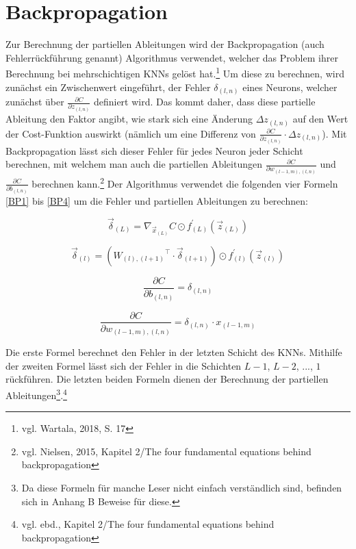 \documentclass[
	a4paper,
	12pt,
	ngerman,
	oneside
]{scrreprt}											%
\begin{document}
		\section{Backpropagation} \label{Backpropagation}
			Zur Berechnung der partiellen Ableitungen wird der Backpropagation (auch Fehlerrückführung genannt) Algorithmus verwendet, welcher das Problem ihrer Berechnung bei mehrschichtigen KNNs gelöst hat.\footnote{vgl. Wartala, 2018, S. 17} Um diese zu berechnen, wird zunächst ein Zwischenwert eingeführt, der Fehler $\delta_{(l,n)}$ eines Neurons, welcher zunächst über $\frac{\partial C}{\partial z_{(l,n)}}$ definiert wird. Das kommt daher, dass diese partielle Ableitung den Faktor angibt, wie stark sich eine Änderung $\Delta z_{(l,n)}$ auf den Wert der Cost-Funktion auswirkt (nämlich um eine Differenz von $\frac{\partial C}{\partial z_{(l,n)}} \cdot \Delta z_{(l,n)}$). Mit Backpropagation lässt sich dieser Fehler für jedes Neuron jeder Schicht berechnen, mit welchem man auch die partiellen Ableitungen $\frac{\partial C}{\partial w_{(l-1,m),(l,n)}}$ und $\frac{\partial C}{\partial b_{(l,n)}}$ berechnen kann.\footnote{vgl. Nielsen, 2015, Kapitel 2/The four fundamental equations behind backpropagation} Der Algorithmus verwendet die folgenden vier Formeln \ref{BP1} bis \ref{BP4} um die Fehler und partiellen Ableitungen zu berechnen: 
	
			\begin{equation}\label{BP1}
				\vec{\delta}_{(L)} = \nabla_{\vec{x}_{(L)}}C \odot f_{(L)}^{\prime} (\vec{z}_{(L)})
			\end{equation}
			
			\begin{equation}\label{BP2}
				\vec{\delta}_{(l)} = ({W_{(l),(l+1)}}^\intercal \cdot \vec{\delta}_{(l+1)}) \odot f_{(l)}^{\prime} (\vec{z}_{(l)})
			\end{equation}
			
			\begin{equation}\label{BP3}
				\frac{\partial C}{\partial b_{(l,n)}} = \delta_{(l,n)}
			\end{equation}
			
			\begin{equation}\label{BP4}
				\frac{\partial C}{\partial w_{(l-1,m), (l,n)}} = \delta_{(l,n)} \cdot x_{(l-1,m)}
			\end{equation}
	
			Die erste Formel berechnet den Fehler in der letzten Schicht des KNNs. Mithilfe der zweiten Formel lässt sich der Fehler in die Schichten $L-1$, $L-2$, ..., $1$ rückführen. Die letzten beiden Formeln dienen der Berechnung der partiellen Ableitungen\footnote{Da diese Formeln für manche Leser nicht einfach verständlich sind, befinden sich in Anhang B Beweise für diese.}.\footnote{vgl. ebd., Kapitel 2/The four fundamental equations behind backpropagation}
	
\end{document}
